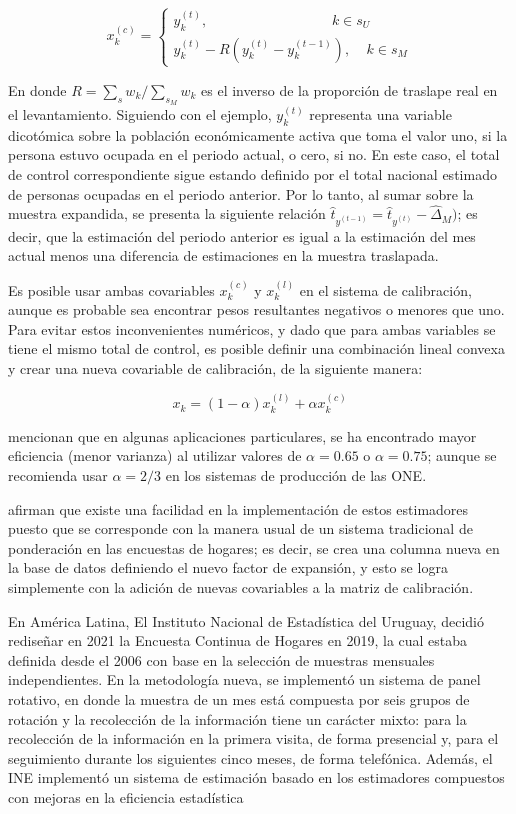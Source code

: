 \documentclass[
  12pt,
]{book}
\begin{document}
\[
x_k^{(c)} = 
\begin{cases}
y_{k}^{(t)}, \ \ \ \ \ \ \ \ \ \ \ \ \ \ \ \ \ \ \ \ \ \ \ \ \ \ \ \ \ \ \ \ \ \ \ \ \ \ \ \ k \in s_U \\
y_{k}^{(t)} - R(y_{k}^{(t)} - y_{k}^{(t-1)}), \ \ \ \ \ k \in s_M 
\end{cases}
\]

En donde \(R = \sum_s w_k / \sum_{s_M} w_k\) es el inverso de la proporción de traslape real en el levantamiento. Siguiendo con el ejemplo, \(y_{k}^{(t)}\) representa una variable dicotómica sobre la población económicamente activa que toma el valor uno, si la persona estuvo ocupada en el periodo actual, o cero, si no. En este caso, el total de control correspondiente sigue estando definido por el total nacional estimado de personas ocupadas en el periodo anterior. Por lo tanto, al sumar sobre la muestra expandida, se presenta la siguiente relación \(\hat{t}_{y^{(t-1)}} = \hat{t}_{y^{(t)}} - \hat{\Delta}_M)\); es decir, que la estimación del periodo anterior es igual a la estimación del mes actual menos una diferencia de estimaciones en la muestra traslapada.

Es posible usar ambas covariables \(x_k^{(c)}\) y \(x_k^{(l)}\) en el sistema de calibración, aunque es probable sea encontrar pesos resultantes negativos o menores que uno. Para evitar estos inconvenientes numéricos, y dado que para ambas variables se tiene el mismo total de control, es posible definir una combinación lineal convexa y crear una nueva covariable de calibración, de la siguiente manera:

\[
x_k = (1-\alpha) x_k^{(l)} + \alpha x_k^{(c)}
\]

\citet{Fuller_Rao_2001} mencionan que en algunas aplicaciones particulares, se ha encontrado mayor eficiencia (menor varianza) al utilizar valores de \(\alpha = 0.65\) o \(\alpha = 0.75\); aunque se recomienda usar \(\alpha = 2/3\) en los sistemas de producción de las ONE.

\citet{Gambino_Kennedy_Singh_2001} afirman que existe una facilidad en la implementación de estos estimadores puesto que se corresponde con la manera usual de un sistema tradicional de ponderación en las encuestas de hogares; es decir, se crea una columna nueva en la base de datos definiendo el nuevo factor de expansión, y esto se logra simplemente con la adición de nuevas covariables a la matriz de calibración.

En América Latina, El Instituto Nacional de Estadística del Uruguay, decidió rediseñar en 2021 la Encuesta Continua de Hogares en 2019, la cual estaba definida desde el 2006 con base en la selección de muestras mensuales independientes. En la metodología nueva, se implementó un sistema de panel rotativo, en donde la muestra de un mes está compuesta por seis grupos de rotación y la recolección de la información tiene un carácter mixto: para la recolección de la información en la primera visita, de forma presencial y, para el seguimiento durante los siguientes cinco meses, de forma telefónica. Además, el INE implementó un sistema de estimación basado en los estimadores compuestos con mejoras en la eficiencia estadística \citep{INEURY}
\end{document}
